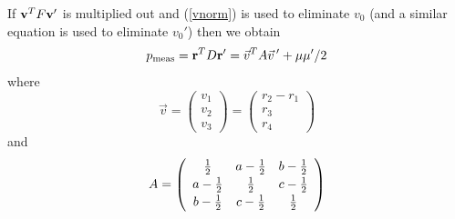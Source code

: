 \documentclass[10pt,twocolumn]{article}
\begin{document}
If ${\bf v}^T F {\bf v}'$ is multiplied out and (\ref{vnorm}) is used to
eliminate $v_0$ (and a similar equation is used to eliminate $v_0'$) then
we obtain
\begin{equation}\label{bloch}
p_{\rm meas} = {\bf r}^T D {\bf r}' = \vec{v}^T A \vec{v}\,'
+ \mu\mu'/2
\end{equation}
where
\begin{equation}
 \vec{v}= \left( \begin{array}{c} v_1 \\ v_2 \\ v_3 \end{array}\right)
=  \left( \begin{array}{c} r_2-r_1 \\ r_3 \\ r_4
 \end{array}\right)
\end{equation}
and
\begin{equation}
A= \left( \begin{array}{ccc}  {1\over 2} &   a-{1\over 2}  &  b -{1\over 2}  \\[2pt]
                              a-{1\over 2} & {1\over 2} &  c-{1\over 2}  \\[2pt]
                              b-{1\over 2} &  c-{1\over 2}& {1\over 2}
                              \end{array} \right)
\end{equation}
\end{document}
